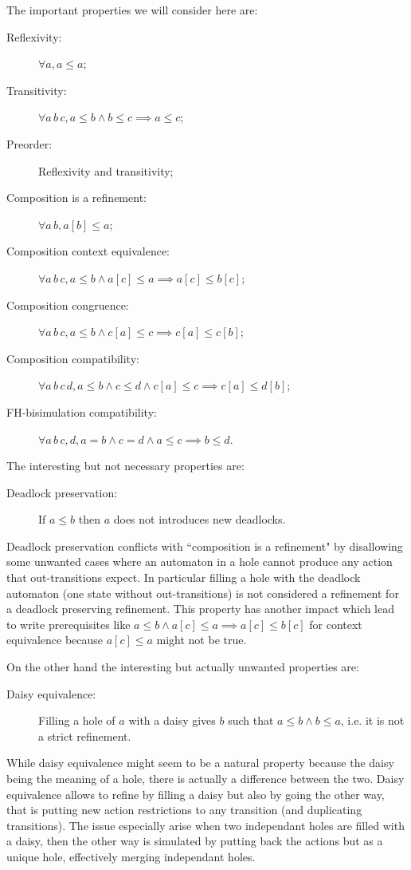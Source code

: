 \documentclass{article}
\theoremstyle{plain}
\theoremstyle{definition}
\newcommand\mbrk[1]{{\left[#1\right]}}
\begin{document}
The important properties we will consider here are:
\begin{description}
\item[Reflexivity:] \(\forall a, a \leq a\);
\item[Transitivity:] \(\forall a\, b\, c, a \leq b \wedge b \leq c \implies a \leq c\);
\item[Preorder:] Reflexivity and transitivity;
\item[Composition is a refinement:] \(\forall a\, b, a\mbrk{b} \leq a\);
\item[Composition context equivalence:] \(\forall a\, b\, c, a \leq b \wedge a\mbrk{c} \leq a \implies a\mbrk{c} \leq b\mbrk{c}\);
\item[Composition congruence:] \(\forall a\, b\, c, a \leq b \wedge c\mbrk{a} \leq c \implies c\mbrk{a} \leq c\mbrk{b}\);
\item[Composition compatibility:] \(\forall a\, b\, c\, d, a \leq b \wedge c \leq d \wedge c\mbrk{a} \leq c \implies c\mbrk{a} \leq d\mbrk{b}\);
\item[FH-bisimulation compatibility:] \(\forall a\, b\, c, d, a = b \wedge c = d \wedge a \leq c \implies b \leq d\).
\end{description}
The interesting but not necessary properties are:
\begin{description}
\item[Deadlock preservation:] If \(a \leq b\) then \(a\) does not introduces new deadlocks.
\end{description}
Deadlock preservation conflicts with ``composition is a refinement" by disallowing some unwanted cases where an automaton in a hole cannot produce any action that out-transitions expect.
In particular filling a hole with the deadlock automaton (one state without out-transitions) is not considered a refinement for a deadlock preserving refinement.
This property has another impact which lead to write prerequisites like \(a \leq b \wedge a\mbrk{c} \leq a \implies a\mbrk{c} \leq b\mbrk{c}\) for context equivalence because \(a\mbrk{c} \leq a\) might not be true.

On the other hand the interesting but actually unwanted properties are:
\begin{description}
\item[Daisy equivalence:] Filling a hole of \(a\) with a daisy gives \(b\) such that \(a \leq b \wedge b \leq a\), i.e. it is not a strict refinement.
\end{description}
While daisy equivalence might seem to be a natural property because the daisy being the meaning of a hole, there is actually a difference between the two.
Daisy equivalence allows to refine by filling a daisy but also by going the other way, that is putting new action restrictions to any transition (and duplicating transitions).
The issue especially arise when two independant holes are filled with a daisy, then the other way is simulated by putting back the actions but as a unique hole, effectively merging independant holes.
\end{document}
